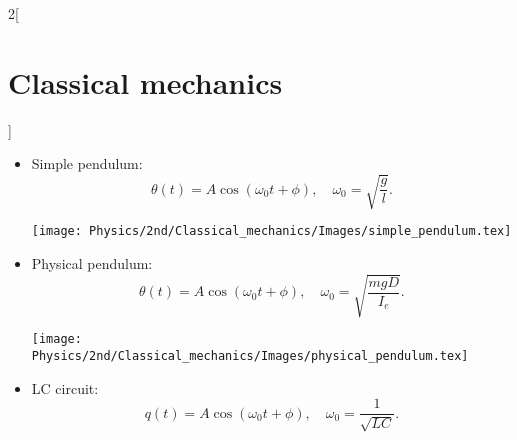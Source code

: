 \documentclass[../../../main.tex]{subfiles}
\begin{document}
\begin{multicols}{2}[\section{Classical mechanics}]
\begin{prop}[Examples]
\begin{itemize}
                  \begin{minipage}{\linewidth}
                      \centering
                      \texttt{[image: Physics/2nd/Classical\_mechanics/Images/springs.tex]}
                  \end{minipage}
            \item Simple pendulum: $$\theta(t)=A\cos(\omega_0t+\phi),\quad\omega_0=\sqrt{\frac{g}{l}}.$$
                  \begin{minipage}{\linewidth}
                      \centering
                      \texttt{[image: Physics/2nd/Classical\_mechanics/Images/simple\_pendulum.tex]}
                  \end{minipage}
            \item Physical pendulum:
                  $$\theta(t)=A\cos(\omega_0t+\phi),\quad\omega_0=\sqrt{\frac{mgD}{I_e}}.$$
                  \begin{minipage}{\linewidth}
                      \centering
                      \texttt{[image: Physics/2nd/Classical\_mechanics/Images/physical\_pendulum.tex]}
                  \end{minipage}
            \item LC circuit: $$q(t)=A\cos(\omega_0t+\phi),\quad\omega_0=\frac{1}{\sqrt{LC}}.$$
        \end{itemize}
    \end{prop}

\end{multicols}
\end{document}
